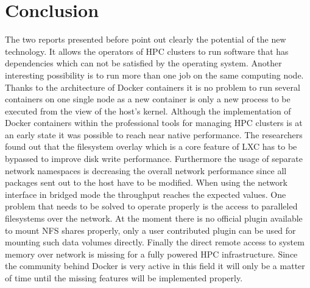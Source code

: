 \documentclass[conference]{IEEEtran}
\begin{document}
\section{Conclusion}
The two reports presented before point out clearly the potential of the new technology. It allows the operators of HPC clusters to run software that has dependencies which can not be satisfied by the operating system. Another interesting possibility is to run more than one job on the same computing node. Thanks to the architecture of Docker containers it is no problem to run several containers on one single node as a new container is only a new process to be executed from the view of the host's kernel. Although the implementation of Docker containers within the professional tools for managing HPC clusters is at an early state it was possible to reach near native performance. The researchers found out that the filesystem overlay which is a core feature of LXC has to be bypassed to improve disk write performance. Furthermore the usage of separate network namespaces is decreasing the overall network performance since all packages sent out to the host have to be modified. When using the network interface in bridged mode the throughput reaches the expected values. One problem that needs to be solved to operate properly is the access to paralleled filesystems over the network. At the moment there is no official plugin available to mount NFS shares properly, only a user contributed plugin can be used for mounting such data volumes directly. Finally the direct remote access to system memory over network is missing for a fully powered HPC infrastructure. Since the community behind Docker is very active in this field it will only be a matter of time until the missing features will be implemented properly.



%
%
%


\end{document}
